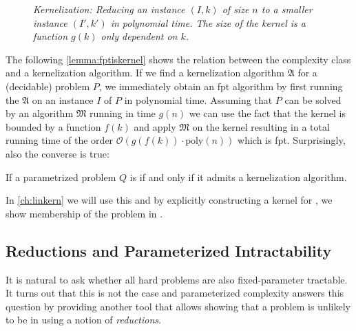 
\begin{figure}
    \centering
    
    \caption{\textit{Kernelization: Reducing an instance $(I,k)$ of size $n$ to a smaller instance $(I', k')$ in polynomial time. The size of the kernel is a function $g(k)$ only dependent on $k$.}}
    \label{fig:kernelization}
\end{figure}


The following \cref{lemma:fptiskernel} shows the relation between the complexity class \FPT and a kernelization algorithm. 
If we find a kernelization algorithm $\mathfrak{A}$ for a (decidable) problem $P$, we immediately obtain an fpt algorithm by first running the $\mathfrak{A}$ on an instance $I$ of $P$ in polynomial time.
Assuming that $P$ can be solved by an algorithm $\mathfrak{M}$ running in time $g(n)$ we can use the fact that the kernel is bounded by a function $f(k)$ and apply $\mathfrak{M}$ on the kernel resulting in a  total running time of the order $\mathcal{O}(g(f(k)) \cdot \mathrm{poly}(n))$ which is fpt.
Surprisingly, also the converse is true:

\begin{lemma}\label{lemma:fptiskernel}
    If a parametrized problem $Q$ is \FPT if and only if it admits a kernelization algorithm.
\end{lemma}

 In \cref{ch:linkern} we will use this and by explicitly constructing a kernel for \psdom, we show membership of the problem in \FPT. 

\subsection{Reductions and Parameterized Intractability}

It is natural to ask whether all hard problems are also fixed-parameter tractable.
It turns out that this is not the case and parameterized complexity answers this question by providing another tool that allows showing that a problem is unlikely to be in \FPT using a notion of \textit{reductions}.

